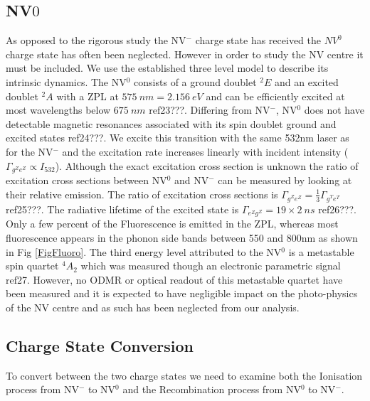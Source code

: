 \documentclass[preprint,prl]{revtex4}
\begin{document}
\subsection{NV$0$}

As opposed to the rigorous study the NV$^-$ charge state has received the $NV^0$ charge state has often been neglected. However in order to study the NV centre it must be included. We use the established three level model to describe its intrinsic dynamics. The NV$^0$ consists of a ground doublet $^2E$ and an excited doublet $^2A$ with a ZPL at $\SI{575}{nm} = \SI{2.156}{eV}$  and can be efficiently excited at most wavelengths below $\SI{675}{nm}$ ref23???. Differing from NV$^-$, NV$^0$ does not have detectable magnetic resonances associated with its spin doublet ground and excited states ref24???. We excite this transition with the same 532nm laser as for the NV$^-$ and the excitation rate increases linearly with incident intensity ($\Gamma_{g^Ze^Z} \propto I_{532}$). Although the exact excitation cross section is unknown the ratio of excitation cross sections between NV$^0$ and NV$^-$ can be measured by looking at their relative emission. The ratio of excitation cross sections is $\Gamma_{g^Ze^Z} = \frac{1}{3} \Gamma_{g^Te^T}$ ref25???. The radiative lifetime of the excited state is $\Gamma_{e^Zg^Z} = 19\times2 \SI{}{ns}$ ref26???.  
 Only a few percent of the Fluorescence is emitted in the ZPL, whereas most fluorescence appears in the phonon side bands between 550 and 800nm as shown in Fig \ref{FigFluoro}. The third energy level attributed to the NV$^0$ is a metastable spin quartet $^4A_2$ which was measured though an electronic parametric signal ref27. However, no ODMR or optical readout of this metastable quartet have been measured and it is expected to have negligible impact on the photo-physics of the NV centre and as such has been neglected from our analysis. 

\subsection{Charge State Conversion}
To convert between the two charge states we need to examine both the Ionisation process from NV$^-$ to NV$^0$ and  the Recombination process from NV$^0$ to NV$^-$.
\end{document}
